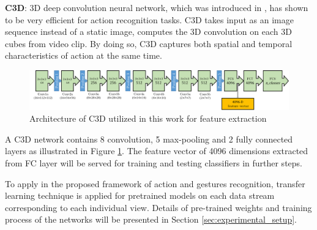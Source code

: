     \textbf{C3D}: 3D deep convolution neural network, which was introduced in \cite{tran2015learning}, has shown to be very efficient for action recognition tasks. C3D takes input as an image sequence instead of a static image, computes the 3D convolution on each 3D cubes from video clip. By doing so, C3D captures both spatial and temporal characteristics of action at the same time.
    \begin{figure}[htbp]
        \centering
        \includegraphics[width=1\linewidth]{Figs/C3D.png}
        \caption{Architecture of C3D utilized in this work for feature extraction}
        \label{fig:C3D}
    \end{figure}
    A C3D network contains 8 convolution, 5 max-pooling and 2 fully connected layers as illustrated in Figure \ref{fig:C3D}. 
    The feature vector of 4096 dimensions extracted from FC layer will be served for training and testing classifiers in further steps.

    To apply in the proposed framework of action and gestures recognition, transfer learning technique is applied for pretrained models on each data stream corresponding to each individual view.
    Details of pre-trained weights and training process of the networks will be presented in Section \ref{sec:experimental_setup}.

